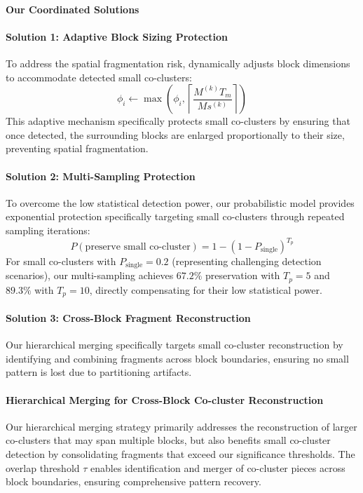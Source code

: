 \documentclass{ar2rc}
\theoremstyle{definition}
\theoremstyle{remark} %
\begin{document}
\paragraph{Our Coordinated Solutions}

\paragraph{Solution 1: Adaptive Block Sizing Protection}
To address the spatial fragmentation risk,  dynamically adjusts block dimensions to accommodate detected small co-clusters:
\begin{equation}
  \phi_i \leftarrow \max\left(\phi_i, \left\lceil\frac{M^{(k)}T_m}{Ms^{(k)}}\right\rceil\right)
\end{equation}
This adaptive mechanism specifically protects small co-clusters by ensuring that once detected, the surrounding blocks are enlarged proportionally to their size, preventing spatial fragmentation.

\paragraph{Solution 2: Multi-Sampling Protection}
To overcome the low statistical detection power, our probabilistic model provides exponential protection specifically targeting small co-clusters through repeated sampling iterations:
\begin{equation}
  P(\text{preserve small co-cluster}) = 1 - \left(1 - P_{\text{single}}\right)^{T_p}
\end{equation}
For small co-clusters with $P_{\text{single}} = 0.2$ (representing challenging detection scenarios), our multi-sampling achieves $67.2\%$ preservation with $T_p = 5$ and $89.3\%$ with $T_p = 10$, directly compensating for their low statistical power.

\paragraph{Solution 3: Cross-Block Fragment Reconstruction}
Our hierarchical merging specifically targets small co-cluster reconstruction by identifying and combining fragments across block boundaries, ensuring no small pattern is lost due to partitioning artifacts.

\paragraph{Hierarchical Merging for Cross-Block Co-cluster Reconstruction}
Our hierarchical merging strategy primarily addresses the reconstruction of larger co-clusters that may span multiple blocks, but also benefits small co-cluster detection by consolidating fragments that exceed our significance thresholds. The overlap threshold $\tau$ enables identification and merger of co-cluster pieces across block boundaries, ensuring comprehensive pattern recovery.
\end{document}
